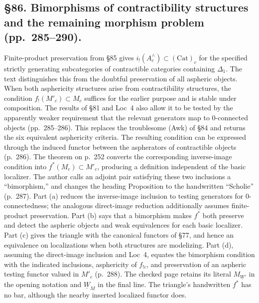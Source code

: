 \documentclass[10pt,oneside]{book}
\begin{document}
\subsection*{\S86. Bimorphisms of contractibility structures and the remaining morphism problem (pp.\ 285--290).}
Finite-product preservation from \S85 gives $i_!(A^\wedge_c)\subset(\mathrm{Cat})_c$ for the specified strictly generating subcategories of contractible categories containing $\Delta_1$. The text distinguishes this from the doubtful preservation of all aspheric objects. When both asphericity structures arise from contractibility structures, the condition $f_!(M'_c)\subset M_c$ suffices for the earlier purpose and is stable under composition. The results of \S81 and Loc~4 also allow it to be tested by the apparently weaker requirement that the relevant generators map to 0-connected objects (pp.\ 285--286). This replaces the troublesome (Awk) of \S84 and returns the six equivalent asphericity criteria. The resulting condition can be expressed through the induced functor between the aspherators of contractible objects (p.\ 286).
The theorem on p.\ 252 converts the corresponding inverse-image condition into $f^*(M_c)\subset M'_c$, producing a definition independent of the basic localizer. The author calls an adjoint pair satisfying these two inclusions a “bimorphism,” and changes the heading Proposition to the handwritten “Scholie” (p.\ 287). Part (a) reduces the inverse-image inclusion to testing generators for 0-connectedness; the analogous direct-image reduction additionally assumes finite-product preservation. Part (b) says that a bimorphism makes $f^*$ both preserve and detect the aspheric objects and weak equivalences for each basic localizer. Part (c) gives the triangle with the canonical functors of \S77, and hence an equivalence on localizations when both structures are modelizing. Part (d), assuming the direct-image inclusion and Loc~4, equates the bimorphism condition with the indicated inclusions, asphericity of $f_{!c}$, and preservation of an aspheric testing functor valued in $M'_c$ (p.\ 288). The checked page retains its literal $M_{\underline W'}$ in the opening notation and $\underline W_M$ in the final line. The triangle's handwritten $f^*$ has no bar, although the nearby inserted localized functor does.
\end{document}
